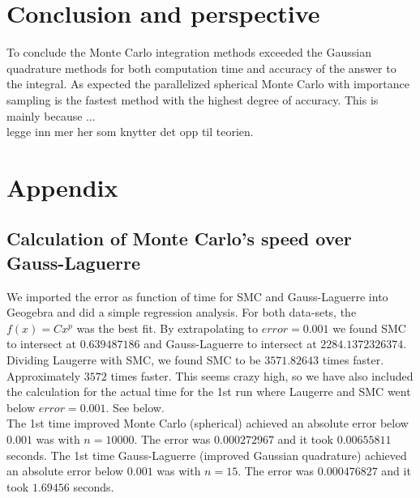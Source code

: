 \documentclass{article}
\begin{document}
\vspace{1cm}

\section{Conclusion and perspective} \label{sec:Conclusion}

To conclude the Monte Carlo integration methods exceeded the Gaussian quadrature methods for both computation time and accuracy of the answer to the integral. As expected the parallelized spherical Monte Carlo with importance sampling is the fastest method with the highest degree of accuracy. This is mainly because ... \\

legge inn mer her som knytter det opp til teorien.


\vspace{1cm}

\section{Appendix} \label{sec:Appendix}

\subsection{Calculation of Monte Carlo's speed over Gauss-Laguerre}
We imported the error as function of time for SMC and Gauss-Laguerre into Geogebra and did a simple regression analysis. For both data-sets, the $f(x)=Cx^p$ was the best fit. By extrapolating to $error=0.001$ we found SMC to intersect at $0.639487186$ and Gauss-Laguerre to intersect at
$2284.1372326374$. Dividing Laugerre with SMC, we found SMC to be $3571.82643$ times faster. Approximately $3572$ times faster. This seems crazy high, so we
have also included the calculation for the actual time for the 1st run where Laugerre and SMC went below $error=0.001$. See below.\\

The 1st time improved Monte Carlo (spherical) achieved an absolute error below $0.001$ was with $n=10000$. The error was $0.000272967$ and it took
$0.00655811$ seconds. The 1st time Gauss-Laguerre (improved Gaussian quadrature) achieved an absolute error below $0.001$ was with $n=15$. The error was $0.000476827$ and it took $1.69456$ seconds. \\
\end{document}
